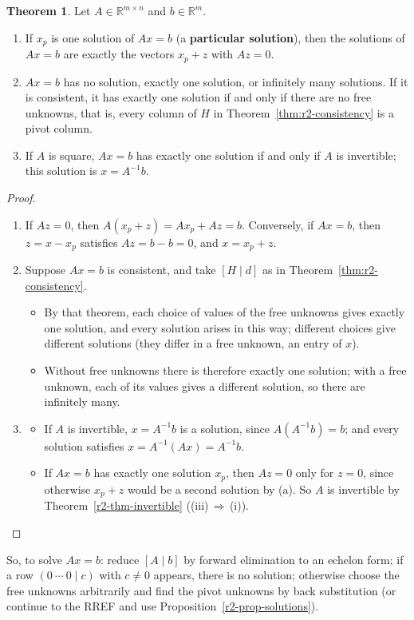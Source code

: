 \documentclass[12pt]{article}
\newcommand{\R}{\mathbb R}
\theoremstyle{definition}
\newtheorem{theorem}{Theorem}
\begin{document}
\begin{theorem}\label{thm:r2-solution-structure}
Let \(A\in\R^{m\times n}\) and \(b\in\R^m\).
\begin{enumerate}
\item If \(x_p\) is one solution of \(Ax=b\) (a \textbf{particular solution}), then the
solutions of \(Ax=b\) are exactly the vectors \(x_p+z\) with \(Az=0\).
\item \(Ax=b\) has no solution, exactly one solution, or infinitely many solutions. If it is
consistent, it has exactly one solution if and only if there are no free unknowns, that is,
every column of \(H\) in Theorem~\ref{thm:r2-consistency} is a pivot column.
\item If \(A\) is square, \(Ax=b\) has exactly one solution if and only if \(A\) is invertible;
this solution is \(x=A^{-1}b\).
\end{enumerate}
\end{theorem}
\begin{proof}
\begin{enumerate}
\item If \(Az=0\), then \(A(x_p+z)=Ax_p+Az=b\). Conversely, if \(Ax=b\), then \(z=x-x_p\)
satisfies \(Az=b-b=0\), and \(x=x_p+z\).
\item Suppose \(Ax=b\) is consistent, and take \([H\mid d]\) as in
Theorem~\ref{thm:r2-consistency}.
\begin{itemize}
\item By that theorem, each choice of values of the free unknowns gives exactly one solution, and every solution
arises in this way; different choices give different solutions (they differ in a free unknown, an entry of \(x\)).
\item Without free unknowns there is therefore exactly one solution; with a free unknown, each
of its values gives a different solution, so there are infinitely many.
\end{itemize}
\item
\begin{itemize}
\item If \(A\) is invertible, \(x=A^{-1}b\) is a solution, since \(A(A^{-1}b)=b\); and every
solution satisfies \(x=A^{-1}(Ax)=A^{-1}b\).
\item If \(Ax=b\) has exactly one solution \(x_p\), then \(Az=0\) only for \(z=0\), since
otherwise \(x_p+z\) would be a second solution by (a). So \(A\) is invertible by
Theorem~\ref{r2-thm-invertible} ((iii)\,\(\Rightarrow\)\,(i)).\qedhere
\end{itemize}
\end{enumerate}
\end{proof}
So, to solve \(Ax=b\): reduce \([A\mid b]\) by forward elimination to an echelon form; if a row
\((0\ \cdots\ 0\mid c)\) with \(c\ne0\) appears, there is no solution; otherwise choose the free
unknowns arbitrarily and find the pivot unknowns by back substitution (or continue to the RREF
and use Proposition~\ref{r2-prop-solutions}).
\end{document}
